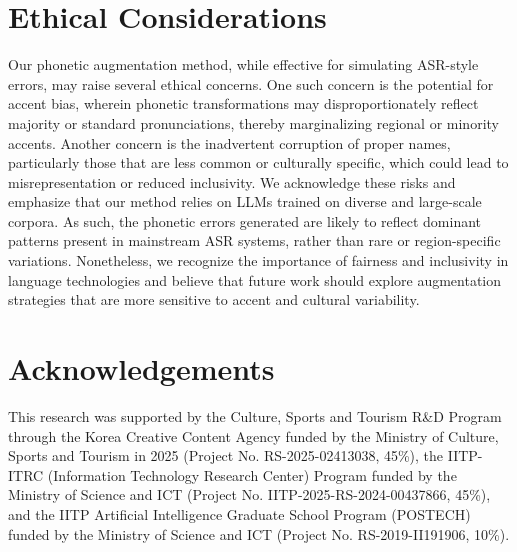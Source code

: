 \documentclass[11pt]{article}
\begin{document}
\section*{Ethical Considerations}
Our phonetic augmentation method, while effective for simulating ASR-style errors, may raise several ethical concerns. One such concern is the potential for accent bias, wherein phonetic transformations may disproportionately reflect majority or standard pronunciations, thereby marginalizing regional or minority accents. Another concern is the inadvertent corruption of proper names, particularly those that are less common or culturally specific, which could lead to misrepresentation or reduced inclusivity. We acknowledge these risks and emphasize that our method relies on LLMs trained on diverse and large-scale corpora. As such, the phonetic errors generated are likely to reflect dominant patterns present in mainstream ASR systems, rather than rare or region-specific variations. Nonetheless, we recognize the importance of fairness and inclusivity in language technologies and believe that future work should explore augmentation strategies that are more sensitive to accent and cultural variability.


\section*{Acknowledgements}
This research was supported by the Culture, Sports and Tourism R\&D Program through the Korea Creative Content Agency funded by the Ministry of Culture, Sports and Tourism in 2025 (Project No. RS-2025-02413038, 45\%),
the IITP-ITRC (Information Technology Research Center) Program funded by the Ministry of Science and ICT (Project No. IITP-2025-RS-2024-00437866, 45\%),
and the IITP Artificial Intelligence Graduate School Program (POSTECH) funded by the Ministry of Science and ICT (Project No. RS-2019-II191906, 10\%).








\clearpage
\appendix

\end{document}

